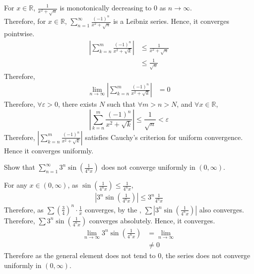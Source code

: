 \documentclass[fleqn, a4paper, 12pt, twoside]{article}
\theoremstyle{definition}
\theoremstyle{theorem}
\begin{document}
\begin{solution}
	For $x \in \mathbb{R}$, $\frac{1}{x^2 + \sqrt{n}}$ is monotonically decreasing to $0$ as $n \to \infty$.\\
	Therefore, for $x \in \mathbb{R}$, $\sum\limits_{n = 1}^{\infty} \frac{(-1)^n}{x^2 + \sqrt{n}}$ is a Leibniz series.
	Hence, it converges pointwise.\\
	\begin{align*}
		\left| \sum\limits_{k = n}^{m} \frac{(-1)^n}{x^2 + \sqrt{k}} \right| & \le \frac{1}{x^2 + \sqrt{n}} \\
                                                                                     & \le \frac{1}{\sqrt{n}}
	\end{align*}
	Therefore,
	\begin{align*}
		\lim\limits_{n \to \infty} \left| \sum\limits_{k = n}^{m} \frac{(-1)^n}{x^2 + \sqrt{k}} \right| & = 0
	\end{align*}
	Therefore, $\forall \varepsilon > 0$, there exists $N$ such that $\forall m > n > N$, and $\forall x \in \mathbb{R}$,
	\begin{equation*}
		\left| \sum\limits_{k = n}^{m} \frac{(-1)^n}{x^2 + \sqrt{k}} \right| \le \frac{1}{\sqrt{n}} < \varepsilon
	\end{equation*}
	Therefore, $\left| \sum\limits_{k = n}^{m} \frac{(-1)^n}{x^2 + \sqrt{k}} \right|$ satisfies Cauchy's criterion for uniform convergence.
	Hence it converges uniformly.
\end{solution}

\begin{question}
	Show that $\sum\limits_{n = 1}^{\infty} 3^n \sin \left( \frac{1}{4^n x} \right)$ does not converge uniformly in $(0,\infty)$.
\end{question}

\begin{solution}
	For any $x \in (0,\infty)$, as $\sin \left( \frac{1}{4^n x} \right) \le \frac{1}{4^n x}$,
	\begin{align*}
		\left| 3^n \sin (\frac{1}{4^n x}) \right| \le 3^n \frac{1}{4^n x}
	\end{align*}
	Therefore, as $\sum \left( \frac{3}{4} \right)^n \cdot \frac{1}{x}$ converges, by the , $\sum \left| 3^n \sin \left( \frac{1}{4^n x} \right) \right|$ also converges.\\
	Therefore, $\sum 3^n \sin (\frac{1}{4^n x})$ converges absolutely.
	Hence, it converges.
	\begin{align*}
		\lim\limits_{n \to \infty} 3^n \sin \left( \frac{1}{4^n x} \right) &= \lim\limits_{n \to \infty}\\
		&\neq 0
	\end{align*}
	Therefore as the general element does not tend to $0$, the series does not converge uniformly in $(0,\infty)$.
\end{solution}
\end{document}
